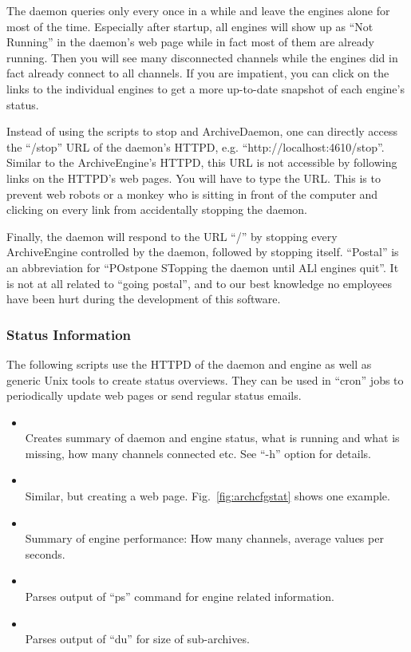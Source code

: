\NOTE The daemon queries only every once in a while and leave the
engines alone for most of the time.
Especially after startup, all engines will show up as ``Not Running''
in the daemon's web page while in fact most of them are already
running. Then you will see many disconnected channels while the
engines did in fact already connect to all channels. 
If you are impatient, you can click on the links to the individual
engines to get a more up-to-date snapshot of each engine's status.

Instead of using the scripts to stop and ArchiveDaemon, one can
directly access the ``/stop'' URL of the daemon's HTTPD,
e.g. ``http://localhost:4610/stop''.  Similar to the ArchiveEngine's
HTTPD, this URL is not accessible by following links on the HTTPD's
web pages. You will have to type the URL. This is to prevent web
robots or a monkey who is sitting in front of the computer and
clicking on every link from accidentally stopping the daemon.

Finally, the daemon will respond to the URL ``/'' by stopping
every ArchiveEngine controlled by the daemon, followed by stopping
itself. ``Postal'' is an abbreviation for ``POstpone STopping the
daemon until ALl engines quit''. It is not at all related to ``going
postal'', and to our best knowledge no  employees have been hurt
during the development of this software.

\subsubsection{Status Information}
The following scripts use the HTTPD of the daemon and engine
as well as generic Unix tools to create status overviews.
They can be used in ``cron'' jobs to periodically update
web pages or send regular status emails.

\begin{itemize}
\item {} \\
      Creates summary of daemon and engine status,
      what is running and what is missing,
      how many channels connected etc.
      See ``-h'' option for details.
\item {} \\
      Similar, but creating a web page. Fig.~\ref{fig:archcfgstat}
      shows one example.
\item {} \\
      Summary of engine performance: How many channels, average values
      per seconds.
\item {} \\
      Parses output of ``ps'' command for engine related information.
\item {} \\
      Parses output of ``du'' for size of sub-archives.
\end{itemize}


